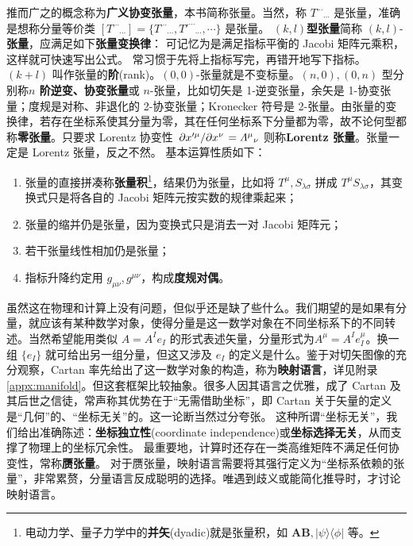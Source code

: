 推而广之的概念称为\textbf{广义协变张量}，本书简称张量。当然，称 $T^{\cdots}{}_{\cdots}$ 是张量，准确是想称分量等价类 $[T^{\cdots}{}_{\cdots}]=\{T^{\cdots}{}_{\cdots},T'^{\cdots}{}_{\cdots},\cdots\}$ 是张量。
$(k,l)$\textbf{型张量}简称 $(k,l)$-\textbf{张量}，应满足如下\textbf{张量变换律}：
可记忆为是满足指标平衡的 Jacobi 矩阵元乘积，这样就可快速写出公式。
常习惯于先将上指标写完，再错开地写下指标。
$(k+l)$ 叫作张量的\textbf{阶}(rank)。$(0,0)$-张量就是不变标量。$(n,0),(0,n)$ 型分别称\textbf{$n$ 阶逆变、协变张量}或 $n$-张量，比如切矢是 1-逆变张量，余矢是 1-协变张量；度规是对称、非退化的 2-协变张量；Kronecker 符号是 2-张量。由张量的变换律，若存在坐标系使其分量为零，其在任何坐标系下分量都为零，故不论何型都称\textbf{零张量}。只要求 Lorentz 协变性 $\pdv*{x'^\mu}{x^\nu}=\Lambda^\mu{}_\nu$ 则称\textbf{Lorentz 张量}。张量一定是 Lorentz 张量，反之不然。
基本运算性质如下：
\begin{enumerate}
    \item 张量的直接拼凑称\textbf{张量积}\footnote{电动力学、量子力学中的\textbf{并矢}(dyadic)就是张量积，如 $\bm A\bm B,|\psi\rangle\langle\phi|$ 等。}，结果仍为张量，比如将 $T^\mu,S_{\lambda\sigma}$ 拼成 $T^\mu S_{\lambda\sigma}$，其变换式只是将各自的 Jacobi 矩阵元按实数的规律乘起来；
    \item 张量的缩并仍是张量，因为变换式只是消去一对 Jacobi 矩阵元；
    \item 若干张量线性相加仍是张量；\item 指标升降约定用 $g_{\mu\nu},g^{\mu\nu}$，构成\textbf{度规对偶}。
\end{enumerate}

虽然这在物理和计算上没有问题，但似乎还是缺了些什么。我们期望的是如果有分量，就应该有某种数学对象，使得分量是这一数学对象在不同坐标系下的不同转述。当然希望能用类似 $A=A^I e_I$ 的形式表述矢量，分量形式为$A^\mu=A^Ie_I^\mu$。换一组 $\{e_I\}$ 就可给出另一组分量，但这又涉及 $e_I$ 的定义是什么。鉴于对切矢图像的充分观察，Cartan 率先给出了这一数学对象的构造，称为\textbf{映射语言}，详见附录 \ref{appx:manifold}。但这套框架比较抽象。很多人因其语言之优雅，成了 Cartan 及其后世之信徒，常声称其优势在于“无需借助坐标”，即 Cartan 关于矢量的定义是“几何”的、“坐标无关”的。这一论断当然过分夸张。
这种所谓“坐标无关”，我们给出准确陈述：\textbf{坐标独立性}(coordinate independence)或\textbf{坐标选择无关}，从而支撑了物理上的坐标冗余性。
最重要地，计算时还存在一类高维矩阵不满足任何协变性，常称\textbf{赝张量}。
对于赝张量，映射语言需要将其强行定义为“坐标系依赖的张量”，非常累赘，分量语言反成聪明的选择。唯遇到歧义或能简化推导时，才讨论映射语言。



